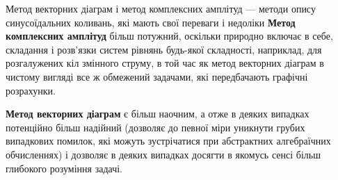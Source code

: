 \begin{More}

	Метод векторних діаграм і метод комплексних амплітуд --- методи опису синусоїдальних коливань, які мають свої переваги і недоліки
		\textbf{Метод комплексних амплітуд} більш потужний, оскільки природно включає в себе, складання і розв'язки систем рівнянь будь-якої складності, наприклад, для розгалужених кіл змінного струму, в той час як метод векторних діаграм в чистому вигляді все ж обмежений задачами, які передбачають графічні розрахунки.

		\textbf{Метод векторних діаграм} є більш наочним, а отже в деяких випадках потенційно більш надійний (дозволяє до певної міри уникнути грубих випадкових помилок, які можуть зустрічатися при абстрактних алгебраїчних обчисленнях) і дозволяє в деяких випадках досягти в якомусь сенсі більш глибокого розуміння задачі.
\end{More}




